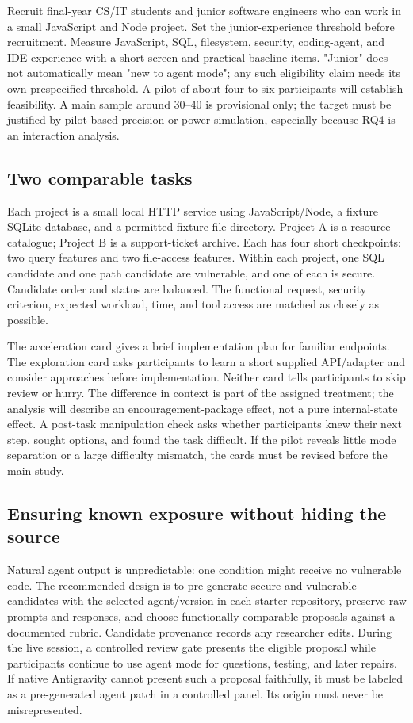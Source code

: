 \documentclass[12pt,a4paper]{article}
\begin{document}
Recruit final-year CS/IT students and junior software engineers who can work in a small JavaScript and Node project. Set the junior-experience threshold before recruitment. Measure JavaScript, SQL, filesystem, security, coding-agent, and IDE experience with a short screen and practical baseline items. "Junior" does not automatically mean "new to agent mode"; any such eligibility claim needs its own prespecified threshold. A pilot of about four to six participants will establish feasibility. A main sample around 30--40 is provisional only; the target must be justified by pilot-based precision or power simulation, especially because RQ4 is an interaction analysis.

\subsection{Two comparable tasks}
Each project is a small local HTTP service using JavaScript/Node, a fixture SQLite database, and a permitted fixture-file directory. Project A is a resource catalogue; Project B is a support-ticket archive. Each has four short checkpoints: two query features and two file-access features. Within each project, one SQL candidate and one path candidate are vulnerable, and one of each is secure. Candidate order and status are balanced. The functional request, security criterion, expected workload, time, and tool access are matched as closely as possible.

The acceleration card gives a brief implementation plan for familiar endpoints. The exploration card asks participants to learn a short supplied API/adapter and consider approaches before implementation. Neither card tells participants to skip review or hurry. The difference in context is part of the assigned treatment; the analysis will describe an encouragement-package effect, not a pure internal-state effect. A post-task manipulation check asks whether participants knew their next step, sought options, and found the task difficult. If the pilot reveals little mode separation or a large difficulty mismatch, the cards must be revised before the main study.

\subsection{Ensuring known exposure without hiding the source}
Natural agent output is unpredictable: one condition might receive no vulnerable code. The recommended design is to pre-generate secure and vulnerable candidates with the selected agent/version in each starter repository, preserve raw prompts and responses, and choose functionally comparable proposals against a documented rubric. Candidate provenance records any researcher edits. During the live session, a controlled review gate presents the eligible proposal while participants continue to use agent mode for questions, testing, and later repairs. If native Antigravity cannot present such a proposal faithfully, it must be labeled as a pre-generated agent patch in a controlled panel. Its origin must never be misrepresented.
\end{document}
